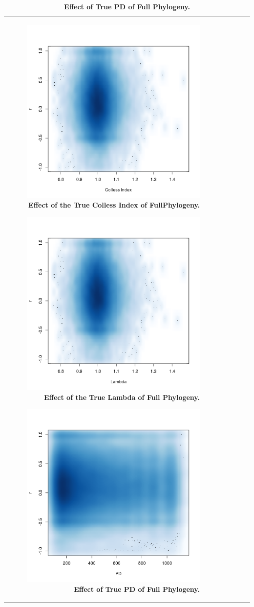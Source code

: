 \documentclass[12pt,english]{article}
\begin{document}
\begin{table}[ht]
\begin{tabular}{rrrrr}
\begin{figure}[!ht]
  \center
  \includegraphics[width=.5\textwidth]{trueColless.png}
  \caption{\textbf{Effect of the True Colless Index of FullPhylogeny.}}
\end{figure}

\begin{figure}[!ht]
  \center
  \includegraphics[width=.5\textwidth]{trueLambda.png}
  \caption{\textbf{Effect of the True Lambda of Full Phylogeny.}}
\end{figure}

\begin{figure}[!ht]
  \center
  \includegraphics[width=.5\textwidth]{PD.png}
  \caption{\textbf{Effect of True PD of Full Phylogeny.}}
\end{figure}


\end{tabular}
\end{table}
\end{document}
